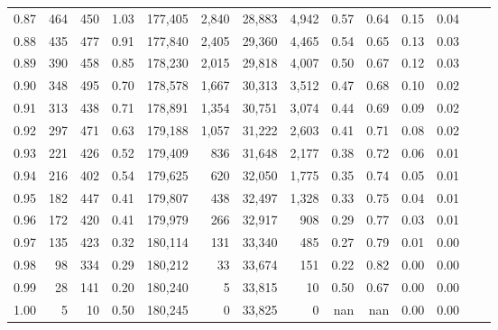 \begin{tabular}{rrrrrrrrrrrrrr}
0.87 &    464 &  450 &    1.03 &  177,405 &    2,840 &  28,883 &   4,942 &  0.57 &  0.64 &  0.15 &      0.04 \\
0.88 &    435 &  477 &    0.91 &  177,840 &    2,405 &  29,360 &   4,465 &  0.54 &  0.65 &  0.13 &      0.03 \\
0.89 &    390 &  458 &    0.85 &  178,230 &    2,015 &  29,818 &   4,007 &  0.50 &  0.67 &  0.12 &      0.03 \\
0.90 &    348 &  495 &    0.70 &  178,578 &    1,667 &  30,313 &   3,512 &  0.47 &  0.68 &  0.10 &      0.02 \\
0.91 &    313 &  438 &    0.71 &  178,891 &    1,354 &  30,751 &   3,074 &  0.44 &  0.69 &  0.09 &      0.02 \\
0.92 &    297 &  471 &    0.63 &  179,188 &    1,057 &  31,222 &   2,603 &  0.41 &  0.71 &  0.08 &      0.02 \\
0.93 &    221 &  426 &    0.52 &  179,409 &      836 &  31,648 &   2,177 &  0.38 &  0.72 &  0.06 &      0.01 \\
0.94 &    216 &  402 &    0.54 &  179,625 &      620 &  32,050 &   1,775 &  0.35 &  0.74 &  0.05 &      0.01 \\
0.95 &    182 &  447 &    0.41 &  179,807 &      438 &  32,497 &   1,328 &  0.33 &  0.75 &  0.04 &      0.01 \\
0.96 &    172 &  420 &    0.41 &  179,979 &      266 &  32,917 &     908 &  0.29 &  0.77 &  0.03 &      0.01 \\
0.97 &    135 &  423 &    0.32 &  180,114 &      131 &  33,340 &     485 &  0.27 &  0.79 &  0.01 &      0.00 \\
0.98 &     98 &  334 &    0.29 &  180,212 &       33 &  33,674 &     151 &  0.22 &  0.82 &  0.00 &      0.00 \\
0.99 &     28 &  141 &    0.20 &  180,240 &        5 &  33,815 &      10 &  0.50 &  0.67 &  0.00 &      0.00 \\
1.00 &      5 &   10 &    0.50 &  180,245 &        0 &  33,825 &       0 &   nan &   nan &  0.00 &      0.00 \\
\bottomrule
\end{tabular}
